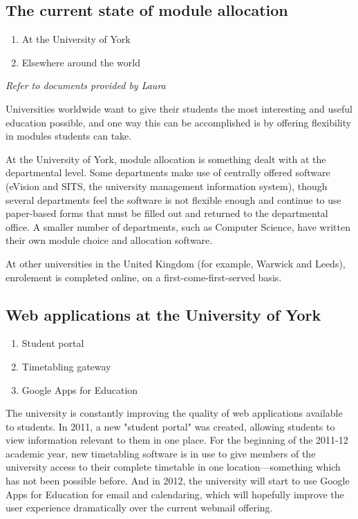 \documentclass[]{scrartcl}
\begin{document}
\subsection{The current state of module allocation}

\begin{enumerate}
  \item At the University of York
  \item Elsewhere around the world
\end{enumerate}

\textit{Refer to documents provided by Laura}

Universities worldwide want to give their students the most interesting and useful education possible, and one way this can be accomplished is by offering flexibility in modules students can take.

At the University of York, module allocation is something dealt with at the departmental level. Some departments make use of centrally offered software (eVision and SITS, the university management information system), though several departments feel the software is not flexible enough and continue to use paper-based forms that must be filled out and returned to the departmental office. A smaller number of departments, such as Computer Science, have written their own module choice and allocation software.

At other universities in the United Kingdom (for example, Warwick and Leeds), enrolement is completed online, on a first-come-first-served basis.

\subsection{Web applications at the University of York}

\begin{enumerate}
  \item Student portal
  \item Timetabling gateway
  \item Google Apps for Education
\end{enumerate}

The university is constantly improving the quality of web applications available to students. In 2011, a new "student portal" was created, allowing students to view information relevant to them in one place. For the beginning of the 2011-12 academic year, new timetabling software is in use to give members of the university access to their complete timetable in one location---something which has not been possible before. And in 2012, the university will start to use Google Apps for Education for email and calendaring, which will hopefully improve the user experience dramatically over the current webmail offering.
\end{document}
